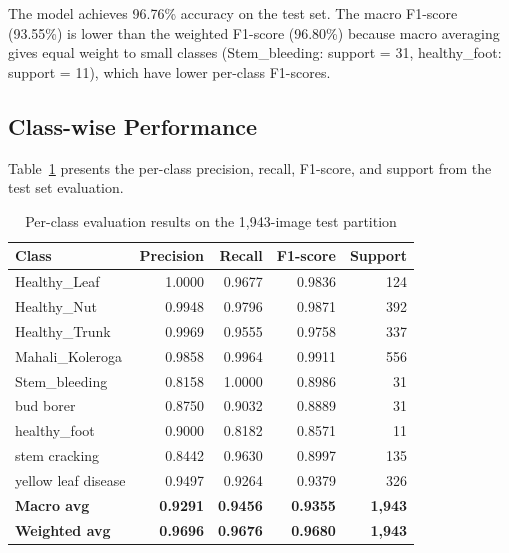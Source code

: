 \documentclass[conference]{IEEEtran}
\begin{document}
The model achieves 96.76\% accuracy on the test set. The macro F1-score (93.55\%) is lower than the weighted F1-score (96.80\%) because macro averaging gives equal weight to small classes (Stem\_bleeding: support = 31, healthy\_foot: support = 11), which have lower per-class F1-scores.

\subsection{Class-wise Performance}

Table~\ref{tab:perclass} presents the per-class precision, recall, F1-score, and support from the test set evaluation.

\begin{table}[htbp]
\caption{Per-class evaluation results on the 1{,}943-image test partition}
\label{tab:perclass}
\centering
\small
\begin{tabular}{l|r|r|r|r}
\toprule
\textbf{Class} & \textbf{Precision} & \textbf{Recall} & \textbf{F1-score} & \textbf{Support} \\
\midrule
Healthy\_Leaf        & 1.0000 & 0.9677 & 0.9836 & 124 \\
Healthy\_Nut         & 0.9948 & 0.9796 & 0.9871 & 392 \\
Healthy\_Trunk       & 0.9969 & 0.9555 & 0.9758 & 337 \\
Mahali\_Koleroga     & 0.9858 & 0.9964 & 0.9911 & 556 \\
Stem\_bleeding       & 0.8158 & 1.0000 & 0.8986 & 31 \\
bud borer            & 0.8750 & 0.9032 & 0.8889 & 31 \\
healthy\_foot        & 0.9000 & 0.8182 & 0.8571 & 11 \\
stem cracking        & 0.8442 & 0.9630 & 0.8997 & 135 \\
yellow leaf disease  & 0.9497 & 0.9264 & 0.9379 & 326 \\
\midrule
\textbf{Macro avg}   & \textbf{0.9291} & \textbf{0.9456} & \textbf{0.9355} & \textbf{1{,}943} \\
\textbf{Weighted avg}& \textbf{0.9696} & \textbf{0.9676} & \textbf{0.9680} & \textbf{1{,}943} \\
\bottomrule
\end{tabular}
\end{table}
\end{document}

